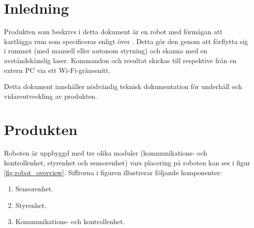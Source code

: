 \documentclass[a4paper,11pt]{article}
\begin{document}
\pagestyle{intro}
\LIPStitelsida
\clearpage
\begin{LIPSprojektidentitet}
\end{LIPSprojektidentitet}

\clearpage
\renewcommand{\familydefault}{\sfdefault}	%
\normalfont
\tableofcontents
\renewcommand{\familydefault}{\rmdefault}	%
\normalfont
\clearpage
\begin{LIPSdokumenthistorik}
    \LIPSversionsinfo{}{}{}{}{}
\end{LIPSdokumenthistorik}
\clearpage
\setcounter{page}{1}
\pagestyle{content}

\section{Inledning}
Produkten som beskrivs i detta dokument är en robot med förmågan att kartlägga rum som specificeras enligt över \cite{coursespec}. Detta gör den genom att förflytta sig i rummet (med manuell eller autonom styrning) och skanna med en avståndskänslig laser. Kommandon och resultat skickas till respektive från en extern PC via ett Wi-Fi-gränssnitt.

Detta dokument innehåller nödvändig teknisk dokumentation för underhåll och vidareutveckling av produkten.

\clearpage
\section{Produkten}
Roboten är uppbyggd med tre olika moduler (kommunikations- och kontrollenhet, styrenhet och sensorenhet) vars placering på roboten kan ses i figur \ref{fig:robot_overview}. Siffrorna i figuren illustrerar följande komponenter:
\begin{enumerate}
\item Sensorenhet.
\item Styrenhet.
\item Kommunikations- och kontrollenhet.
\end{enumerate}
\end{document}
